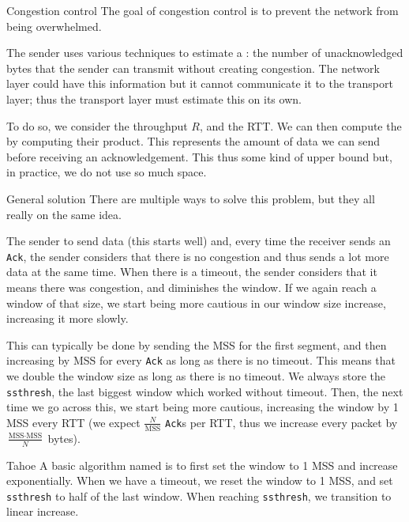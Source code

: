 \documentclass[a4paper]{article}
\begin{document}
\begin{parag}{Congestion control}
    The goal of congestion control is to prevent the network from being overwhelmed. 

    The sender uses various techniques to estimate a : the number of unacknowledged bytes that the sender can transmit without creating congestion. The network layer could have this information but it cannot communicate it to the transport layer; thus the transport layer must estimate this on its own.

    To do so, we consider the throughput $R$, and the RTT. We can then compute the  by computing their product. This represents the amount of data we can send before receiving an acknowledgement. This thus some kind of upper bound but, in practice, we do not use so much space.


    \begin{subparag}{General solution}
        There are multiple ways to solve this problem, but they all really on the same idea.

        The sender to send data (this starts well) and, every time the receiver sends an \texttt{Ack}, the sender considers that there is no congestion and thus sends a lot more data at the same time. When there is a timeout, the sender considers that it means there was congestion, and diminishes the window. If we again reach a window of that size, we start being more cautious in our window size increase, increasing it more slowly.

        This can typically be done by sending the MSS for the first segment, and then increasing by MSS for every \texttt{Ack} as long as there is no timeout. This means that we double the window size as long as there is no timeout. We always store the \texttt{ssthresh}, the last biggest window which worked without timeout. Then, the next time we go across this, we start being more cautious, increasing the window by 1 MSS every RTT (we expect $\frac{N}{\text{MSS}}$ \texttt{Ack}s per RTT, thus we increase every packet by $\frac{\text{MSS}\cdot \text{MSS}}{N}$ bytes).
    \end{subparag}

    \begin{subparag}{Tahoe}
        A basic algorithm named  is to first set the window to 1 MSS and increase exponentially. When we have a timeout, we reset the window to 1 MSS, and set \texttt{ssthresh} to half of the last window. When reaching \texttt{ssthresh}, we transition to linear increase.
    \end{subparag}


\end{parag}
\end{document}
